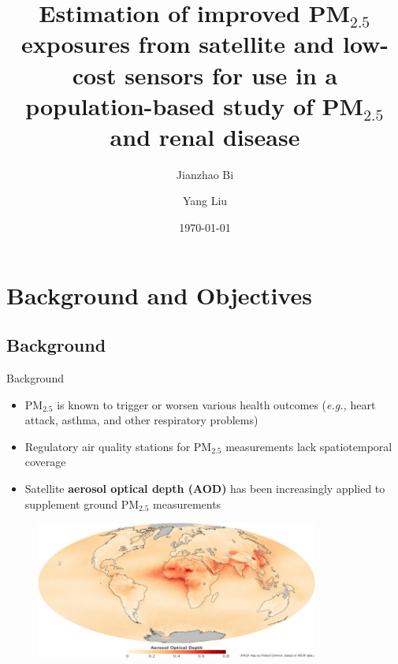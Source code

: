 \documentclass{beamer}
\title[]{\large Estimation of improved PM$_{2.5}$ exposures from satellite and low-cost sensors for use in a population-based study of PM$_{2.5}$ and renal disease}
\author[]{Jianzhao Bi\inst{1} \and \textcolor[rgb]{0.1,0.6,0.1}{Yang Liu}\inst{1}\inst{*}}
\institute[Emory University] %
{
  \inst{1}%
  Environmental Health Sciences\\
  Emory University
 }
\date{\today}
\begin{document}
\begin{frame}
  \titlepage
\end{frame}

\section{Background and Objectives}
\subsection{Background}
\begin{frame}{Background}
    \begin{itemize}
        \item PM$_{2.5}$ is known to trigger or worsen various health outcomes (\textit{e.g.,} heart attack, asthma, and other respiratory problems)
        \pause
        \item Regulatory air quality stations for PM$_{2.5}$ measurements lack spatiotemporal coverage
        \pause
        \item Satellite \textbf{aerosol optical depth (AOD)} has been increasingly applied to supplement ground PM$_{2.5}$ measurements
    \end{itemize}
    \vspace{-0.25cm}
    \begin{figure}
        \centering
        \includegraphics[width=0.83\textwidth]{img/satellite_aod.jpg}
        \label{fig:pm25}
    \end{figure}
\end{frame}
\end{document}
